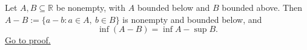 \begin{theorem}
\label{thm:infimum-difference-set}
Let $A,B\subseteq\mathbb{R}$ be nonempty, with $A$ bounded below and $B$
bounded above.  Then $A-B:=\{a-b:a\in A,\ b\in B\}$ is nonempty and bounded
below, and
\[
  \inf(A-B)=\inf A-\sup B.
\]
\hyperref[prf:infimum-difference-set]{Go to proof.}
\end{theorem}